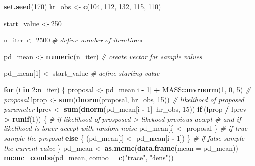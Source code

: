 \documentclass[
  12pt,
]{book}
\newenvironment{Shaded}{\begin{snugshade}}{\end{snugshade}}
\newcommand{\CommentTok}[1]{\textcolor[rgb]{0.56,0.35,0.01}{\textit{#1}}}
\newcommand{\ControlFlowTok}[1]{\textcolor[rgb]{0.13,0.29,0.53}{\textbf{#1}}}
\newcommand{\DataTypeTok}[1]{\textcolor[rgb]{0.13,0.29,0.53}{#1}}
\newcommand{\DecValTok}[1]{\textcolor[rgb]{0.00,0.00,0.81}{#1}}
\newcommand{\KeywordTok}[1]{\textcolor[rgb]{0.13,0.29,0.53}{\textbf{#1}}}
\newcommand{\NormalTok}[1]{#1}
\newcommand{\OperatorTok}[1]{\textcolor[rgb]{0.81,0.36,0.00}{\textbf{#1}}}
\newcommand{\StringTok}[1]{\textcolor[rgb]{0.31,0.60,0.02}{#1}}
\begin{document}
\begin{Shaded}
\begin{Highlighting}[]
\KeywordTok{set.seed}\NormalTok{(}\DecValTok{170}\NormalTok{)}
\NormalTok{hr\_obs \textless{}{-}}\StringTok{ }\KeywordTok{c}\NormalTok{(}\DecValTok{104}\NormalTok{, }\DecValTok{112}\NormalTok{, }\DecValTok{132}\NormalTok{, }\DecValTok{115}\NormalTok{, }\DecValTok{110}\NormalTok{)}

\NormalTok{start\_value \textless{}{-}}\StringTok{ }\DecValTok{250}

\NormalTok{n\_iter \textless{}{-}}\StringTok{ }\DecValTok{2500} \CommentTok{\# define number of iterations}

\NormalTok{pd\_mean \textless{}{-}}\StringTok{ }\KeywordTok{numeric}\NormalTok{(n\_iter) }\CommentTok{\# create vector for sample values}

\NormalTok{pd\_mean[}\DecValTok{1}\NormalTok{] \textless{}{-}}\StringTok{ }\NormalTok{start\_value }\CommentTok{\# define starting value}

\ControlFlowTok{for}\NormalTok{ (i }\ControlFlowTok{in} \DecValTok{2}\OperatorTok{:}\NormalTok{n\_iter) \{}
\NormalTok{  proposal \textless{}{-}}\StringTok{ }\NormalTok{pd\_mean[i }\OperatorTok{{-}}\StringTok{ }\DecValTok{1}\NormalTok{] }\OperatorTok{+}\StringTok{ }\NormalTok{MASS}\OperatorTok{::}\KeywordTok{mvrnorm}\NormalTok{(}\DecValTok{1}\NormalTok{, }\DecValTok{0}\NormalTok{, }\DecValTok{5}\NormalTok{) }\CommentTok{\# proposal}
\NormalTok{  lprop \textless{}{-}}\StringTok{ }\KeywordTok{sum}\NormalTok{(}\KeywordTok{dnorm}\NormalTok{(proposal, hr\_obs, }\DecValTok{15}\NormalTok{)) }\CommentTok{\# likelihood of proposed parameter}
\NormalTok{  lprev \textless{}{-}}\StringTok{ }\KeywordTok{sum}\NormalTok{(}\KeywordTok{dnorm}\NormalTok{(pd\_mean[i }\OperatorTok{{-}}\StringTok{ }\DecValTok{1}\NormalTok{], hr\_obs, }\DecValTok{15}\NormalTok{))}
  \ControlFlowTok{if}\NormalTok{ (lprop }\OperatorTok{/}\StringTok{ }\NormalTok{lprev }\OperatorTok{\textgreater{}}\StringTok{ }\KeywordTok{runif}\NormalTok{(}\DecValTok{1}\NormalTok{)) \{ }\CommentTok{\# if likelihood of prosposed \textgreater{} likehood previous accept}
    \CommentTok{\# and if likelihood is lower accept with random noise}
\NormalTok{    pd\_mean[i] \textless{}{-}}\StringTok{ }\NormalTok{proposal}
\NormalTok{  \} }\CommentTok{\# if true sample the proposal}
  \ControlFlowTok{else}\NormalTok{ \{}
\NormalTok{    (pd\_mean[i] \textless{}{-}}\StringTok{ }\NormalTok{pd\_mean[i }\OperatorTok{{-}}\StringTok{ }\DecValTok{1}\NormalTok{])}
\NormalTok{  \} }\CommentTok{\# if false sample the current value}
\NormalTok{\}}
\NormalTok{pd\_mean \textless{}{-}}\StringTok{ }\KeywordTok{as.mcmc}\NormalTok{(}\KeywordTok{data.frame}\NormalTok{(}\DataTypeTok{mean =}\NormalTok{ pd\_mean))}
\KeywordTok{mcmc\_combo}\NormalTok{(pd\_mean, }\DataTypeTok{combo =} \KeywordTok{c}\NormalTok{(}\StringTok{"trace"}\NormalTok{, }\StringTok{"dens"}\NormalTok{))}
\end{Highlighting}
\end{Shaded}
\end{document}
